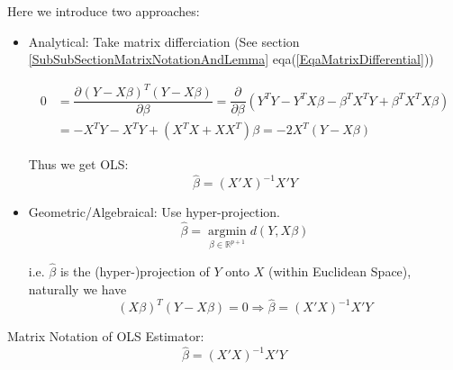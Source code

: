     Here we introduce two approaches:
\begin{itemize}[topsep=2pt,itemsep=2pt]
    \item Analytical: Take matrix differciation (See \hypertarget{MatrixDifferenciation}{section \ref{SubSubSectionMatrixNotationAndLemma}} eqa(\ref{EqaMatrixDifferential}))
    
   

\begin{align*}
    0&=\dfrac{\partial^{} (Y-X\beta )^T(Y-X\beta ) }{\partial \beta ^{}} =\dfrac{\partial^{} }{\partial\beta  ^{}}(Y^TY- Y^TX\beta -\beta ^TX^TY+\beta ^TX^TX\beta )\\ 
    &=-X^TY-X^TY+(X^TX+XX^T)\beta 
    =-2X^T(Y-X\beta )
\end{align*}
    
    Thus we get OLS:
    \begin{equation}
        \hat{\beta }=(X'X)^{-1}X'Y 
    \end{equation}
    
    
    \item Geometric/Algebraical: Use hyper-projection.
    \begin{equation}
        \hat{\beta }=\mathop{ \arg\min }\limits_{\beta \in \mathbb{R}^{p+1} } d(Y,X\beta )
    \end{equation}

    i.e. $ \hat{\beta } $ is the (hyper-)projection of $ Y $ onto $ X $ (within Euclidean Space), naturally we have
    \begin{equation}
        (X\beta )^T(Y-X\beta )=0\Rightarrow \hat{\beta }=(X'X)^{-1}X'Y 
    \end{equation}

\end{itemize}

\begin{point}
    Matrix Notation of OLS Estimator:
    \begin{equation}
        \hat{\beta }=(X'X)^{-1}X'Y 
    \end{equation}
\end{point}


